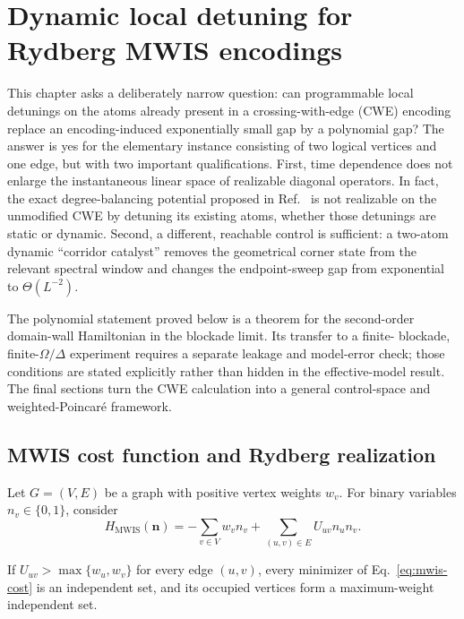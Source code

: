 \chapter{Dynamic local detuning for Rydberg MWIS encodings}
\label{chap:mwis-dynamic-detuning}

This chapter asks a deliberately narrow question: can programmable local
detunings on the atoms already present in a crossing-with-edge (CWE) encoding
replace an encoding-induced exponentially small gap by a polynomial gap?  The
answer is yes for the elementary instance consisting of two logical vertices
and one edge, but with two important qualifications.  First, time dependence
does not enlarge the instantaneous linear space of realizable diagonal
operators.  In fact, the exact degree-balancing potential proposed in
Ref.~\cite{bombieri2025quantum} is not realizable on the unmodified CWE by
detuning its existing atoms, whether those detunings are static or dynamic.
Second, a different, reachable control is sufficient: a two-atom dynamic
``corridor catalyst'' removes the geometrical corner state from the relevant
spectral window and changes the endpoint-sweep gap from exponential to
$\Theta(L^{-2})$.

The polynomial statement proved below is a theorem for the second-order
domain-wall Hamiltonian in the blockade limit.  Its transfer to a finite-
blockade, finite-$\Omega/\Delta$ experiment requires a separate leakage and
model-error check; those conditions are stated explicitly rather than hidden
in the effective-model result.  The final sections turn the CWE calculation
into a general control-space and weighted-Poincar\'e framework.

\section{MWIS cost function and Rydberg realization}
\label{sec:mwis-cost-rydberg}

Let $G=(V,E)$ be a graph with positive vertex weights $w_v$.  For binary
variables $n_v\in\{0,1\}$, consider
\begin{equation}
 H_{\mathrm{MWIS}}(\mathbf n)
 =-\sum_{v\in V}w_v n_v
 +\sum_{(u,v)\in E}U_{uv}n_un_v .
 \label{eq:mwis-cost}
\end{equation}

\begin{lemma}
\label{lem:mwis-penalty}
If $U_{uv}>\max\{w_u,w_v\}$ for every edge $(u,v)$, every minimizer of
Eq.~\eqref{eq:mwis-cost} is an independent set, and its occupied vertices form
a maximum-weight independent set.
\end{lemma}

